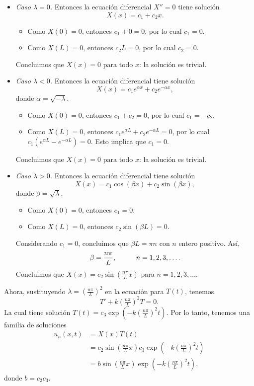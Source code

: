 \documentclass[11pt,letterpaper]{report}
\newcommand\<{\langle}
\renewcommand\>{\rangle}
\begin{document}
\begin{itemize}
  \item \emph{Caso $\lambda=0$.}
  Entonces la ecuación diferencial $X''=0$ tiene solución
  \[
    X(x)=c_1+c_2x
  .\]
  \begin{itemize}
    \item
    Como $X(0)=0$, entonces $c_1+0=0$, por lo cual $c_1=0$.
    \item
    Como $X(L)=0$, entonces $c_2L=0$, por lo cual $c_2=0$.
  \end{itemize}
  Concluimos que $X(x)=0$ para todo $x$: la solución es trivial.

  \item \emph{Caso $\lambda<0$.}
  Entonces la ecuación diferencial tiene solución
  \[
    X(x) = c_1e^{\alpha x} + c_2 e^{-\alpha x}
  ,\]
  donde $\alpha=\sqrt{-\lambda}$.
  \begin{itemize}
    \item
    Como $X(0)=0$, entonces $c_1+c_2=0$, por lo cual $c_1=-c_2$.
    \item
    Como $X(L)=0$, entonces $c_1e^{\alpha L}+c_2e^{-\alpha L}=0$,
    por lo cual $c_1(e^{\alpha L}-e^{-\alpha L})=0$. Esto implica
    que $c_1=0$.
  \end{itemize}
  Concluimos que $X(x)=0$ para todo $x$: la solución es trivial.

  \item \emph{Caso $\lambda>0$.}
  Entonces la ecuación diferencial tiene solución
  \[
    X(x)= c_1\cos(\beta x)+c_2\sin(\beta x)
  ,\]
  donde $\beta=\sqrt{\lambda}$.
  \begin{itemize}
    \item Como $X(0)=0$, entonces $c_1=0$.
    \item Como $X(L)=0$, entonces $c_2\sin(\beta L)=0$.
  \end{itemize}
  Considerando $c_1=0$, concluimos que $\beta L=\pi n$ con $n$
  entero positivo. Así,
  \[
    \beta= \frac{n\pi}{L}, \hspace{10mm} n=1,2,3,\dots
  .\]
  Concluimos que
  $X(x)=c_2\sin(\tfrac{n\pi}{L}x)$ para $n=1,2,3,\dots$.
\end{itemize}

Ahora, sustituyendo $\lambda=(\tfrac{n\pi}{L})^2$ en la ecuación
para $T(t)$, tenemos
\[
  T' + k (\tfrac{n\pi}{L})^2 T = 0
.\]
La cual tiene solución $T(t)=c_3\exp(-k(\tfrac{n\pi}{L})^2t)$.
Por lo tanto, tenemos una familia de soluciones
\begin{align*}
  u_n(x,t)
  &= X(x)T(t) \\
  &= c_2\sin(\tfrac{n\pi}{L}x)c_3\exp(-k(\tfrac{n\pi}{L})^2t) \\
  &= b\sin(\tfrac{n\pi}{L}x)\exp(-k(\tfrac{n\pi}{L})^2t),
\end{align*}
donde $b=c_2c_3$.
\end{document}
